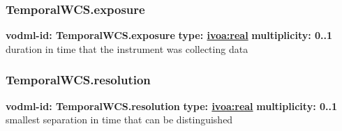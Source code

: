     \subsubsection{TemporalWCS.exposure}
      \textbf{vodml-id: TemporalWCS.exposure} \newline
      \textbf{type: \hyperref[sect:ivoa]{ivoa:real}} \newline
      \textbf{multiplicity: 0..1} \newline
      duration in time that the instrument was collecting data

    \subsubsection{TemporalWCS.resolution}
      \textbf{vodml-id: TemporalWCS.resolution} \newline
      \textbf{type: \hyperref[sect:ivoa]{ivoa:real}} \newline
      \textbf{multiplicity: 0..1} \newline
      smallest separation in time that can be distinguished